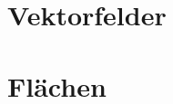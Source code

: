 \documentclass[a4paper,11pt]{article} %
\theoremstyle{costum} %
\begin{document}
\section{Vektorfelder}

\vspace{3ex}
\section{Flächen}

\vspace{3ex}

\vspace*{\fill} %

\begin{flushright}
\end{flushright}
\end{document}

